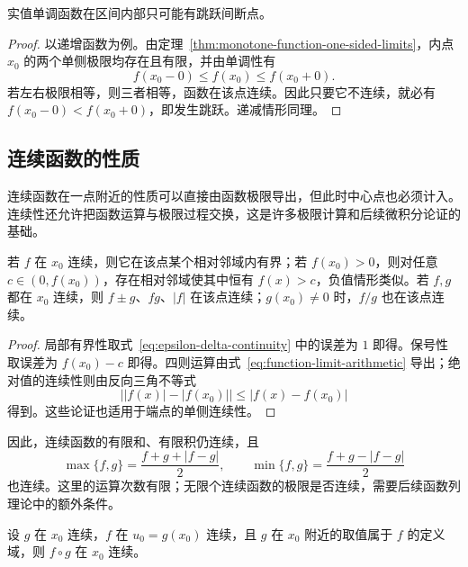 \documentclass[UTF8,12pt,a4paper,fontset=fandol]{ctexbook}
\begin{document}
\begin{proposition}[单调函数的间断类型]
\label{prop:monotone-function-discontinuities}
实值单调函数在区间内部只可能有跳跃间断点。
\end{proposition}

\begin{proof}
以递增函数为例。由定理~\ref{thm:monotone-function-one-sided-limits}，内点 $x_0$ 的两个单侧极限均存在且有限，并由单调性有
\[
    f(x_0-0)\leq f(x_0)\leq f(x_0+0).
\]
若左右极限相等，则三者相等，函数在该点连续。因此只要它不连续，就必有 $f(x_0-0)<f(x_0+0)$，即发生跳跃。递减情形同理。
\end{proof}

\subsection{连续函数的性质}
\label{subsec:properties-of-continuous-functions}

连续函数在一点附近的性质可以直接由函数极限导出，但此时中心点也必须计入。连续性还允许把函数运算与极限过程交换，这是许多极限计算和后续微积分论证的基础。

\begin{proposition}[连续性的局部性质与运算]
\label{prop:local-properties-and-operations-of-continuity}
若 $f$ 在 $x_0$ 连续，则它在该点某个相对邻域内有界；若 $f(x_0)>0$，则对任意 $c\in(0,f(x_0))$，存在相对邻域使其中恒有 $f(x)>c$，负值情形类似。若 $f,g$ 都在 $x_0$ 连续，则 $f\pm g$、$fg$、$|f|$ 在该点连续；$g(x_0)\neq0$ 时，$f/g$ 也在该点连续。
\end{proposition}

\begin{proof}
局部有界性取式~\eqref{eq:epsilon-delta-continuity} 中的误差为 $1$ 即得。保号性取误差为 $f(x_0)-c$ 即得。四则运算由式~\eqref{eq:function-limit-arithmetic} 导出；绝对值的连续性则由反向三角不等式
\[
    \bigl||f(x)|-|f(x_0)|\bigr|\leq|f(x)-f(x_0)|
\]
得到。这些论证也适用于端点的单侧连续性。
\end{proof}

因此，连续函数的有限和、有限积仍连续，且
\[
    \max\{f,g\}=\frac{f+g+|f-g|}{2},
    \qquad \min\{f,g\}=\frac{f+g-|f-g|}{2}
\]
也连续。这里的运算次数有限；无限个连续函数的极限是否连续，需要后续函数列理论中的额外条件。

\begin{theorem}[复合函数的连续性]
\label{thm:composition-of-continuous-functions}
设 $g$ 在 $x_0$ 连续，$f$ 在 $u_0=g(x_0)$ 连续，且 $g$ 在 $x_0$ 附近的取值属于 $f$ 的定义域，则 $f\circ g$ 在 $x_0$ 连续。
\end{theorem}
\end{document}
